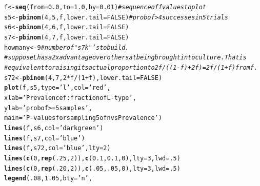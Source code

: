 \documentclass{article}\usepackage[]{graphicx}\usepackage[]{color}
\makeatletter
\newcommand{\hlnum}[1]{\textcolor[rgb]{0.686,0.059,0.569}{#1}}%
\newcommand{\hlstr}[1]{\textcolor[rgb]{0.192,0.494,0.8}{#1}}%
\newcommand{\hlcom}[1]{\textcolor[rgb]{0.678,0.584,0.686}{\textit{#1}}}%
\newcommand{\hlopt}[1]{\textcolor[rgb]{0,0,0}{#1}}%
\newcommand{\hlstd}[1]{\textcolor[rgb]{0.345,0.345,0.345}{#1}}%
\newcommand{\hlkwb}[1]{\textcolor[rgb]{0.69,0.353,0.396}{#1}}%
\newcommand{\hlkwc}[1]{\textcolor[rgb]{0.333,0.667,0.333}{#1}}%
\newcommand{\hlkwd}[1]{\textcolor[rgb]{0.737,0.353,0.396}{\textbf{#1}}}%
\newenvironment{kframe}{%
 \def\at@end@of@kframe{}%
 \ifinner\ifhmode%
  \def\at@end@of@kframe{\end{minipage}}%
  \begin{minipage}{\columnwidth}%
 \fi\fi%
 \def\FrameCommand##1{\hskip\@totalleftmargin \hskip-\fboxsep
 \colorbox{shadecolor}{##1}\hskip-\fboxsep
     \hskip-\linewidth \hskip-\@totalleftmargin \hskip\columnwidth}%
 \MakeFramed {\advance\hsize-\width
   \@totalleftmargin\z@ \linewidth\hsize
   \@setminipage}}%
 {\par\unskip\endMakeFramed%
 \at@end@of@kframe}
\newenvironment{knitrout}{}{} %
\makeatother
\begin{document}
\begin{knitrout}\footnotesize
{}\color{fgcolor}\begin{kframe}
\begin{alltt}
\hlstd{f}  \hlkwb{<-} \hlkwd{seq}\hlstd{(}\hlkwc{from}\hlstd{=}\hlnum{0.0}\hlstd{,} \hlkwc{to}\hlstd{=}\hlnum{1.0}\hlstd{,} \hlkwc{by}\hlstd{=}\hlnum{0.01}\hlstd{)}     \hlcom{# sequence of f values to plot}
\hlstd{s5} \hlkwb{<-} \hlkwd{pbinom}\hlstd{(}\hlnum{4}\hlstd{,} \hlnum{5}\hlstd{, f,} \hlkwc{lower.tail}\hlstd{=}\hlnum{FALSE}\hlstd{)}  \hlcom{# prob of >4 successes in 5 trials}
\hlstd{s6} \hlkwb{<-} \hlkwd{pbinom}\hlstd{(}\hlnum{4}\hlstd{,} \hlnum{6}\hlstd{, f,} \hlkwc{lower.tail}\hlstd{=}\hlnum{FALSE}\hlstd{)}
\hlstd{s7} \hlkwb{<-} \hlkwd{pbinom}\hlstd{(}\hlnum{4}\hlstd{,} \hlnum{7}\hlstd{, f,} \hlkwc{lower.tail}\hlstd{=}\hlnum{FALSE}\hlstd{)}
\hlstd{howmany} \hlkwb{<-} \hlnum{9}                             \hlcom{# number of "s7k"'s to build. }
\hlcom{# suppose L has a 2x advantage over others at being brought into culture.  That is  }
\hlcom{# equivalent to raising its actual proportion to 2f/((1-f)+2f) = 2f/(1+f) from f.}
\hlstd{s72} \hlkwb{<-} \hlkwd{pbinom}\hlstd{(}\hlnum{4}\hlstd{,} \hlnum{7}\hlstd{,} \hlnum{2}\hlopt{*}\hlstd{f}\hlopt{/}\hlstd{(}\hlnum{1}\hlopt{+}\hlstd{f),} \hlkwc{lower.tail}\hlstd{=}\hlnum{FALSE}\hlstd{)}
\hlkwd{plot}\hlstd{(f, s5,} \hlkwc{type}\hlstd{=}\hlstr{'l'}\hlstd{,} \hlkwc{col}\hlstd{=}\hlstr{'red'}\hlstd{,}
     \hlkwc{xlab}\hlstd{=}\hlstr{'Prevalence f: fraction of L-type'}\hlstd{,}
     \hlkwc{ylab}\hlstd{=}\hlstr{'prob of >= 5 samples'}\hlstd{,}
     \hlkwc{main}\hlstd{=}\hlstr{'P-values for sampling 5 of n vs Prevalence'}\hlstd{)}
\hlkwd{lines}\hlstd{(f, s6,}  \hlkwc{col}\hlstd{=}\hlstr{'darkgreen'}\hlstd{)}
\hlkwd{lines}\hlstd{(f, s7,}  \hlkwc{col}\hlstd{=}\hlstr{'blue'}\hlstd{)}
\hlkwd{lines}\hlstd{(f, s72,} \hlkwc{col}\hlstd{=}\hlstr{'blue'}\hlstd{,}\hlkwc{lty}\hlstd{=}\hlnum{2}\hlstd{)}
\hlkwd{lines}\hlstd{(}\hlkwd{c}\hlstd{(}\hlnum{0}\hlstd{,}\hlkwd{rep}\hlstd{(}\hlnum{.25}\hlstd{,}\hlnum{2}\hlstd{)),} \hlkwd{c}\hlstd{(}\hlnum{0.1}\hlstd{,} \hlnum{0.1}\hlstd{,} \hlnum{0}\hlstd{),} \hlkwc{lty}\hlstd{=}\hlnum{3}\hlstd{,} \hlkwc{lwd}\hlstd{=}\hlnum{.5}\hlstd{)}
\hlkwd{lines}\hlstd{(}\hlkwd{c}\hlstd{(}\hlnum{0}\hlstd{,}\hlkwd{rep}\hlstd{(}\hlnum{.20}\hlstd{,}\hlnum{2}\hlstd{)),} \hlkwd{c}\hlstd{(}\hlnum{.05}\hlstd{,} \hlnum{.05}\hlstd{,} \hlnum{0}\hlstd{),} \hlkwc{lty}\hlstd{=}\hlnum{3}\hlstd{,} \hlkwc{lwd}\hlstd{=}\hlnum{.5}\hlstd{)}
\hlkwd{legend}\hlstd{(}\hlnum{.08}\hlstd{,}\hlnum{1.05}\hlstd{,} \hlkwc{bty}\hlstd{=}\hlstr{'n'}\hlstd{,}

\end{alltt}
\end{kframe}
\end{knitrout}
\end{document}
